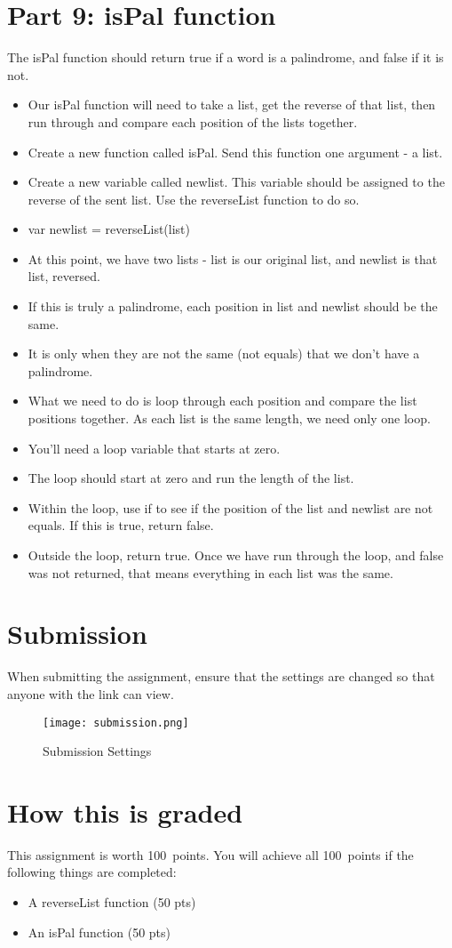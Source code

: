 \documentclass{article}
\newcommand{\AValue}{100}
\begin{document}
\section*{Part 9: isPal function}
The isPal function should return true if a word is a palindrome, and false if it is not.
\begin{itemize}
	\item Our isPal function will need to take a list, get the reverse of that list, then run through and compare each position of the lists together.
	\item Create a new function called isPal.  Send this function one argument - a list.
	\item Create a new variable called newlist.  This variable should be assigned to the reverse of the sent list.  Use the reverseList function to do so.
	\item var newlist = reverseList(list)
	\item At this point, we have two lists - list is our original list, and newlist is that list, reversed.
	\item If this is truly a palindrome, each position in list and newlist should be the same.
	\item It is only when they are not the same (not equals) that we don't have a palindrome.
	\item What we need to do is loop through each position and compare the list positions together.  As each list is the same length, we need only one loop.
	\item You'll need a loop variable that starts at zero.
	\item The loop should start at zero and run the length of the list.
	\item Within the loop, use if to see if the position of the list and newlist are not equals.  If this is true, return false.
	\item Outside the loop, return true.  Once we have run through the loop, and false was not returned, that means everything in each list was the same.
\end{itemize}

\section*{Submission}
When submitting the assignment, ensure that the settings are changed so that anyone with the link can view.
\begin{figure}[H]
  \centering
  \texttt{[image: submission.png]}
  \caption{Submission Settings}
\end{figure}

\section*{How this is graded}
This assignment is worth \AValue \ points. You will achieve all \AValue \   points if the following things are completed:
\begin{itemize}
    \item A reverseList function (50 pts)
    \item An isPal function (50 pts)
\end{itemize}
\end{document}
